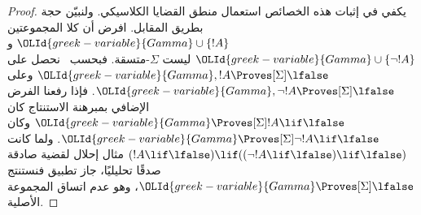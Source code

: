 \documentclass[../../../include/open-logic-section]{subfiles}
\begin{document}
\begin{proof}
  يكفي في إثبات هذه الخصائص استعمال منطق القضايا الكلاسيكي.
  ولنبيّن حجة  بطريق المقابل.
  افرض أن كلا المجموعتين $\OLId{greek-variable}{Gamma} \cup \{!A\}$ و$\OLId{greek-variable}{Gamma} \cup \{\lnot!A\}$
  ليست $ \Sigma$-متسقة. فبحسب~ نحصل على
  $\OLId{greek-variable}{Gamma}, !A \Proves[\Sigma] \lfalse$ وعلى
  $\OLId{greek-variable}{Gamma}, \lnot !A \Proves[\Sigma] \lfalse$. فإذا رفعنا الفرض الإضافي
  بمبرهنة الاستنتاج كان
  $\OLId{greek-variable}{Gamma} \Proves[\Sigma] !A \lif \lfalse$ وكان
  $\OLId{greek-variable}{Gamma} \Proves[\Sigma] \lnot!A \lif \lfalse$. ولما كانت
  $(!A \lif \lfalse) \lif ((\lnot!A \lif \lfalse) \lif \lfalse)$
  مثال إحلال لقضية صادقة صدقًا تحليليًا، جاز تطبيق
  فنستنتج $\OLId{greek-variable}{Gamma} \Proves[\Sigma] \lfalse$، وهو عدم اتساق المجموعة الأصلية.
\end{proof}
\end{document}
